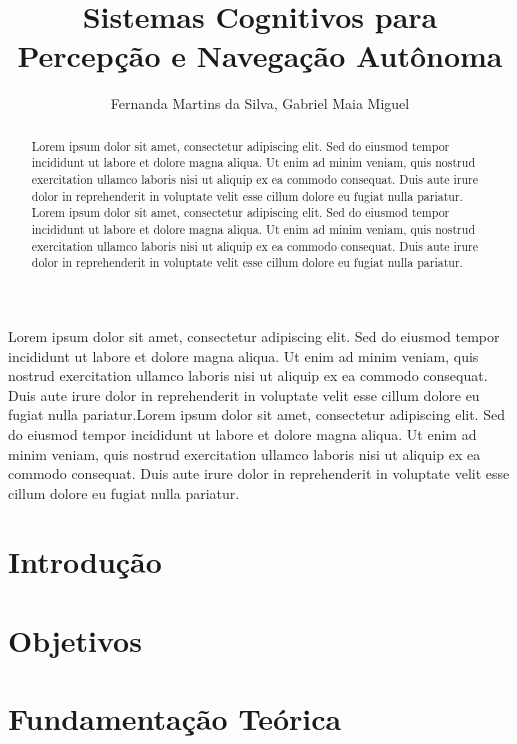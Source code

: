 \documentclass{SBCbookchapter}
\author{Fernanda Martins da Silva, Gabriel Maia Miguel}
\title{Sistemas Cognitivos para Percepção e Navegação Autônoma}
\begin{document}
\maketitle

\begin{abstract}
Lorem ipsum dolor sit amet, consectetur adipiscing elit. Sed do eiusmod tempor incididunt ut labore et dolore magna aliqua. Ut enim ad minim veniam, quis nostrud exercitation ullamco laboris nisi ut aliquip ex ea commodo consequat. Duis aute irure dolor in reprehenderit in voluptate velit esse cillum dolore eu fugiat nulla pariatur. Lorem ipsum dolor sit amet, consectetur adipiscing elit. Sed do eiusmod tempor incididunt ut labore et dolore magna aliqua. Ut enim ad minim veniam, quis nostrud exercitation ullamco laboris nisi ut aliquip ex ea commodo consequat. Duis aute irure dolor in reprehenderit in voluptate velit esse cillum dolore eu fugiat nulla pariatur.
\end{abstract}

\begin{resumo}
\begin{otherlanguage}{brazilian}
Lorem ipsum dolor sit amet, consectetur adipiscing elit. Sed do eiusmod tempor incididunt ut labore et dolore magna aliqua. Ut enim ad minim veniam, quis nostrud exercitation ullamco laboris nisi ut aliquip ex ea commodo consequat. Duis aute irure dolor in reprehenderit in voluptate velit esse cillum dolore eu fugiat nulla pariatur.Lorem ipsum dolor sit amet, consectetur adipiscing elit. Sed do eiusmod tempor incididunt ut labore et dolore magna aliqua. Ut enim ad minim veniam, quis nostrud exercitation ullamco laboris nisi ut aliquip ex ea commodo consequat. Duis aute irure dolor in reprehenderit in voluptate velit esse cillum dolore eu fugiat nulla pariatur.
\end{otherlanguage}
\end{resumo}
\pagebreak

\section{Introdução}


\section{Objetivos}


\section{Fundamentação Teórica}
\end{document}

